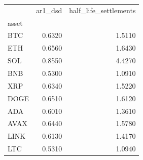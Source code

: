 \begin{tabular}{lrr}
\toprule
 & ar1_dsd & half_life_settlements \\
asset &  &  \\
\midrule
BTC & 0.6320 & 1.5110 \\
ETH & 0.6560 & 1.6430 \\
SOL & 0.8550 & 4.4270 \\
BNB & 0.5300 & 1.0910 \\
XRP & 0.6340 & 1.5220 \\
DOGE & 0.6510 & 1.6120 \\
ADA & 0.6010 & 1.3610 \\
AVAX & 0.6440 & 1.5780 \\
LINK & 0.6130 & 1.4170 \\
LTC & 0.5310 & 1.0940 \\
\bottomrule
\end{tabular}
